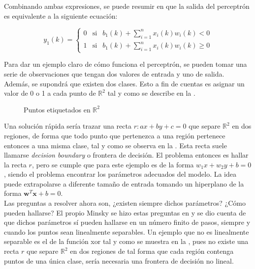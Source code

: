 		Combinando ambas expresiones, se puede resumir en que la salida del perceptrón es equivalente a la siguiente ecuación: 
		
		$$
		y_1(k) = \left\{\begin{array}{ccc}
			0 & \text{si} & b_1(k) + \displaystyle\sum_{i=1}^n x_i(k)w_i(k) < 0\\
			1 & \text{si} & b_1(k) + \displaystyle\sum_{i=1}^n x_i(k)w_i(k) \geq 0
		\end{array}
		\right.
		$$
		
		Para dar un ejemplo claro de cómo funciona el perceptrón, se pueden tomar una serie de observaciones que tengan dos valores de entrada y uno de salida. Además, se supondrá que existen dos clases. Esto a fin de cuentas es asignar un valor de 0 o 1 a cada punto de $\mathbb{R}^2$ tal y como se describe en la . \\
		
		\begin{figure}[!h]
			\centering
			\caption{Puntos etiquetados en $\mathbb{R}^2$}
			\label{fig:labeled_data}
		\end{figure}
		
		Una solución rápida sería trazar una recta $r: ax + by + c = 0$ que separe $\mathbb{R}^2$ en dos regiones, de forma que todo punto que pertenezca a una región pertenece entonces a una misma clase, tal y como se observa en la . Esta recta suele llamarse \textit{decision boundary} o frontera de decisión. El problema entonces es hallar la recta $r$, pero se cumple que para este ejemplo es de la forma $w_1 x + w_2 y + b = 0$, siendo el problema encontrar los parámetros adecuados del modelo. La idea puede extrapolarse a diferente tamaño de entrada tomando un hiperplano de la forma $\textbf{w}^T \textbf{x} + b = 0$. \\
		
		Las preguntas a resolver ahora son, ¿existen siempre dichos parámetros? ¿Cómo pueden hallarse? El propio Minsky se hizo estas preguntas en \cite{perceptrons} y se dio cuenta de que dichos parámetros sí pueden hallarse en un número finito de pasos, siempre y cuando los puntos sean linealmente separables. Un ejemplo que no es linealmente separable es el de la función \gls{xor} tal y como se muestra en la , pues no existe una recta $r$ que separe $\mathbb{R}^2$ en dos regiones de tal forma que cada región contenga puntos de una única clase, sería necesaria una frontera de decisión no lineal. \\
		
